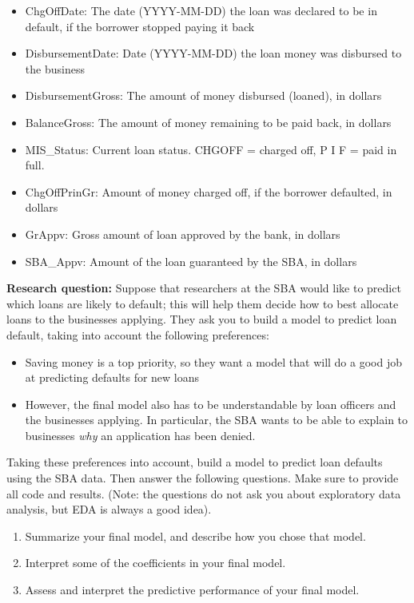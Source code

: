 \documentclass[11pt]{article}
\begin{document}
\begin{itemize}
\item ChgOffDate: 	The date (YYYY-MM-DD) the loan was declared to be in default, if the borrower stopped paying it back
\item DisbursementDate: 	Date (YYYY-MM-DD) the loan money was disbursed to the business
\item DisbursementGross:	The amount of money disbursed (loaned), in dollars
\item BalanceGross: 	The amount of money remaining to be paid back, in dollars
\item MIS\_Status: 	Current loan status. CHGOFF = charged off, P I F = paid in full.
\item ChgOffPrinGr: 	Amount of money charged off, if the borrower defaulted, in dollars
\item GrAppv: 	Gross amount of loan approved by the bank, in dollars
\item SBA\_Appv: 	Amount of the loan guaranteed by the SBA, in dollars 
\end{itemize}

\noindent \textbf{Research question:} Suppose that researchers at the SBA would like to predict which loans are likely to default; this will help them decide how to best allocate loans to the businesses applying. They ask you to build a model to predict loan default, taking into account the following preferences:
\begin{itemize}
\item Saving money is a top priority, so they want a model that will do a good job at predicting defaults for new loans

\item However, the final model also has to be understandable by loan officers and the businesses applying. In particular, the SBA wants to be able to explain to businesses \textit{why} an application has been denied.
\end{itemize}

\noindent Taking these preferences into account, build a model to predict loan defaults using the SBA data. Then answer the following questions. Make sure to provide all code and results. (Note: the questions do not ask you about exploratory data analysis, but EDA is always a good idea).

\begin{enumerate}
\item Summarize your final model, and describe how you chose that model. 

\item Interpret some of the coefficients in your final model.

\item Assess and interpret the predictive performance of your final model.
\end{enumerate}
\end{document}
